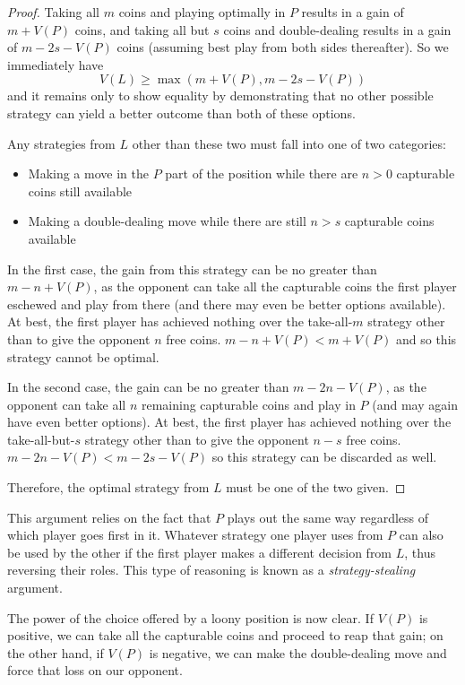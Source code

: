 \documentclass[a4paper,twocolumn]{article}
\begin{document}
\begin{proof}
  Taking all $m$ coins and playing optimally in $P$ results in a gain
  of $m+V(P)$ coins, and taking all but $s$ coins and double-dealing
  results in a gain of $m-2s-V(P)$ coins (assuming best play from both
  sides thereafter). So we immediately have $$V(L) \ge \max(m+V(P),
  m-2s-V(P))$$ and it remains only to show equality by demonstrating
  that no other possible strategy can yield a better outcome than both
  of these options.

  Any strategies from $L$ other than these two must fall into one of
  two categories:
  \begin{itemize}
    \item Making a move in the $P$ part of the position while there
      are $n > 0$ capturable coins still available
    \item Making a double-dealing move while there are still $n > s$
      capturable coins available
  \end{itemize}

  In the first case, the gain from this strategy can be no greater
  than $m-n+V(P)$, as the opponent can take all the capturable coins
  the first player eschewed and play from there (and there may even be
  better options available). At best, the first player has achieved
  nothing over the take-all-$m$ strategy other than to give the
  opponent $n$ free coins. $m-n+V(P) < m+V(P)$ and so this strategy
  cannot be optimal.

  In the second case, the gain can be no greater than $m-2n-V(P)$, as
  the opponent can take all $n$ remaining capturable coins and play in
  $P$ (and may again have even better options). At best, the first
  player has achieved nothing over the take-all-but-$s$ strategy other
  than to give the opponent $n - s$ free coins.  $m-2n-V(P) <
  m-2s-V(P)$ so this strategy can be discarded as well.

  Therefore, the optimal strategy from $L$ must be one of the two
  given.
\end{proof}

This argument relies on the fact that $P$ plays out the same way
regardless of which player goes first in it. Whatever strategy one
player uses from $P$ can also be used by the other if the first player
makes a different decision from $L$, thus reversing their roles. This
type of reasoning is known as a \emph{strategy-stealing} argument.

The power of the choice offered by a loony position is now clear. If
$V(P)$ is positive, we can take all the capturable coins and proceed
to reap that gain; on the other hand, if $V(P)$ is negative, we can
make the double-dealing move and force that loss on our opponent.
\end{document}
